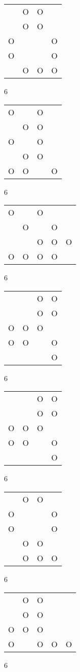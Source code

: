 \begin{tabular}{|m{0.2cm}m{0.2cm}m{0.2cm}m{0.2cm}|}\hline
 &O&O& \\
 &O&O& \\
O& & &O\\
O& & &O\\
 &O&O&O\\
\hline\end{tabular}6
\begin{tabular}{|m{0.2cm}m{0.2cm}m{0.2cm}m{0.2cm}|}\hline
O& &O& \\
 &O&O& \\
O& &O& \\
 &O&O& \\
O&O& &O\\
\hline\end{tabular}6
\begin{tabular}{|m{0.2cm}m{0.2cm}m{0.2cm}m{0.2cm}m{0.2cm}|}\hline
O& &O& & \\
 &O& &O& \\
 & &O&O&O\\
O&O&O&O& \\
\hline\end{tabular}6
\begin{tabular}{|m{0.2cm}m{0.2cm}m{0.2cm}m{0.2cm}|}\hline
 & &O&O\\
 & &O&O\\
O&O&O& \\
O&O& &O\\
 & & &O\\
\hline\end{tabular}6
\begin{tabular}{|m{0.2cm}m{0.2cm}m{0.2cm}m{0.2cm}|}\hline
 & &O&O\\
 & &O&O\\
O&O&O& \\
O&O& &O\\
 & & &O\\
\hline\end{tabular}6
\begin{tabular}{|m{0.2cm}m{0.2cm}m{0.2cm}m{0.2cm}|}\hline
 &O&O& \\
O& & &O\\
O& & &O\\
 &O&O& \\
 &O&O&O\\
\hline\end{tabular}6
\begin{tabular}{|m{0.2cm}m{0.2cm}m{0.2cm}m{0.2cm}m{0.2cm}|}\hline
 &O&O& & \\
 &O&O& & \\
O&O&O& & \\
O& &O&O&O\\
\hline\end{tabular}6
